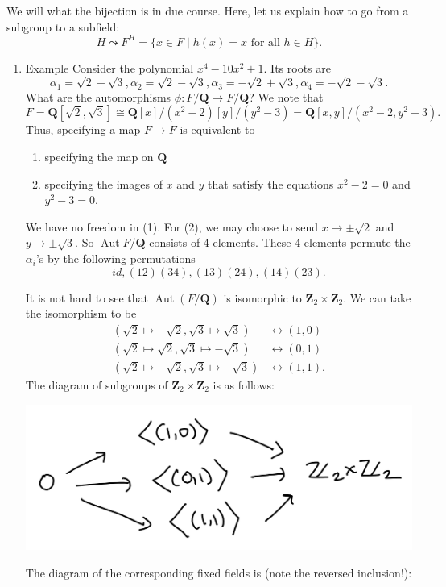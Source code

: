 \documentclass[11pt]{article}
\begin{document}
We will what the bijection is in due course. 
Here, let us explain how to go from a subgroup to a subfield:
\[ H \leadsto F^H = \{x \in F \mid h(x) = x \text{ for all } h \in H\}.\]
\begin{enumerate}
\item Example
\label{sec:org1c858d7}
Consider the polynomial \(x^4-10x^2+1\).
Its roots are
\[ \alpha_1 = \sqrt 2 + \sqrt 3, \alpha_2 = \sqrt 2 - \sqrt 3, \alpha_3 = -\sqrt 2 + \sqrt 3, \alpha_4 = -\sqrt 2 - \sqrt 3.\]
What are the automorphisms \(\phi \colon F / \mathbf{Q} \to F / \mathbf{Q}\)?
We note that
\[ F = \mathbf{Q}[\sqrt 2, \sqrt 3] \cong \mathbf{Q}[x]/(x^2-2) [y]/(y^2-3) = \mathbf{Q}[x,y]/(x^2-2,y^2-3).\]
Thus, specifying a map \(F \to F\) is equivalent to
\begin{enumerate}
\item specifying the map on \(\mathbf{Q}\)
\item specifying the images of \(x\) and \(y\) that satisfy the equations \(x^2-2 = 0\) and \(y^2-3 = 0\).
\end{enumerate}
We have no freedom in (1). 
For (2), we may choose to send \(x \to \pm \sqrt 2\) and \(y \to \pm \sqrt 3\).
So \(\operatorname{Aut} F/ \mathbf{Q}\) consists of 4 elements.
These 4 elements permute the \(\alpha_{i}\)'s by the following permutations
\[ id, (12)(34), (13)(24), (14)(23).\]

It is not hard to see that \(\operatorname{Aut}(F/\mathbf{Q})\)  is isomorphic to \(\mathbf{Z}_2 \times \mathbf{Z}_2\).
We can take the isomorphism to be
\begin{align*}
(\sqrt 2 \mapsto -\sqrt 2, \sqrt 3 \mapsto \sqrt 3) &\leftrightarrow (1,0) \\
(\sqrt 2 \mapsto \sqrt 2, \sqrt 3 \mapsto -\sqrt 3) &\leftrightarrow (0,1) \\
(\sqrt 2 \mapsto - \sqrt 2, \sqrt 3 \mapsto -\sqrt 3) &\leftrightarrow (1,1).
\end{align*}
The diagram of subgroups of \(\mathbf{Z}_2 \times \mathbf{Z}_2\) is as follows:

\begin{center}
\includegraphics[width=.9\linewidth]{assets/Course_notes/2023-04-18_13-47-16_screenshot.png}
\end{center}
The diagram of the corresponding fixed fields is (note the reversed inclusion!):


\end{enumerate}
\end{document}
